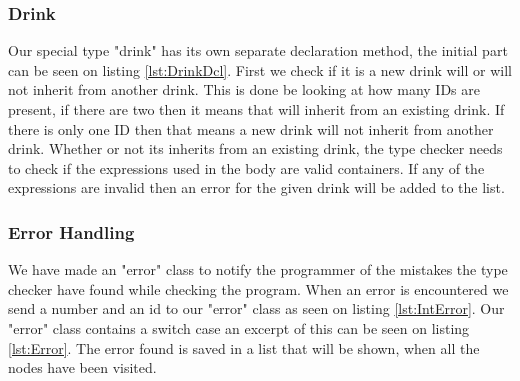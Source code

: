 \subsubsection{Drink}
Our special type "drink" has its own separate declaration method, the initial part can be seen on listing \ref{lst:DrinkDcl}. First we check if it is a new drink will or will not inherit from another drink. This is done be looking at how many IDs are present, if there are two then it means that will inherit from an existing drink. If there is only one ID then that means a new drink will not inherit from another drink.
Whether or not its inherits from an existing drink, the type checker needs to check if the expressions used in the body are valid containers. If any of the expressions are invalid then an error for the given drink will be added to the list.

\subsubsection{Error Handling}
We have made an "error" class to notify the programmer of the mistakes the type checker have found while checking the program. When an error is encountered we send a number and an id to our "error" class as seen on listing \ref{lst:IntError}.
Our "error" class contains a switch case an excerpt of this can be seen on listing \ref{lst:Error}. The error found is saved in a list that will be shown, when all the nodes have been visited.
